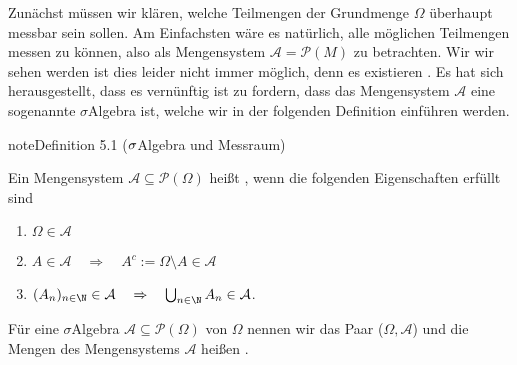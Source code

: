 \documentclass[letterpaper,10pt,english]{jupyterBook}
\begin{document}
\sphinxAtStartPar
Zunächst müssen wir klären, welche Teilmengen der Grundmenge \(\Omega\) überhaupt messbar sein sollen.
Am Einfachsten wäre es natürlich, alle möglichen Teilmengen messen zu können, also als Mengensystem \(\mathcal{A} = \mathcal{P}(M)\) zu betrachten.
Wir wir sehen werden ist dies leider nicht immer möglich, denn es existieren .
Es hat sich herausgestellt, dass es vernünftig ist zu fordern, dass das Mengensystem \(\mathcal{A}\) eine sogenannte \(\sigma\)\sphinxhyphen{}Algebra ist, welche wir in der folgenden Definition einführen werden.
\label{masstheorie/masstheorie:def:sigmaalgebra}
\begin{sphinxadmonition}{note}{Definition 5.1 (\protect\(\sigma\protect\)\sphinxhyphen{}Algebra und Messraum)}



\sphinxAtStartPar
Ein Mengensystem \(\mathcal{A} \subseteq \mathcal{P}(\Omega)\) heißt , wenn die folgenden Eigenschaften erfüllt sind
\begin{enumerate}
%
\item {} 
\sphinxAtStartPar
\(\Omega\in \mathcal{A}\)

\item {} 
\sphinxAtStartPar
\(A\in \mathcal{A} \quad \Rightarrow \quad A^c:=\Omega \setminus A\in \mathcal{A}\)

\item {} 
\sphinxAtStartPar
\((A_n)_{n\in\N} \in \mathcal{A} \quad \Rightarrow \quad \bigcup_{n\in \N} A_n\in \mathcal{A}\).

\end{enumerate}

\sphinxAtStartPar
Für eine \(\sigma\)\sphinxhyphen{}Algebra \(\mathcal{A} \subseteq \mathcal{P}(\Omega)\) von \(\Omega\) nennen wir das Paar (\(\Omega,\mathcal{A}\))  und die Mengen des Mengensystems \(\mathcal{A}\) heißen .
\end{sphinxadmonition}
\end{document}
